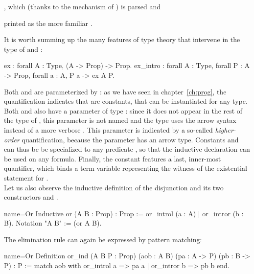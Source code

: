 , which (thanks
to the  mechanism of \Coq{}) is parsed and

printed as the more familiar .

It is worth summing up the many features of type theory that
intervene in the type of  and :

\begin{coq}{}{}
ex : forall A : Type, (A -> Prop) -> Prop.
ex_intro : forall A : Type, forall P : A -> Prop, forall a : A, P a -> ex A P.
\end{coq}

Both  and  are parameterized by : as
we have seen in chapter~\ref{ch:prog}, the 
quantification indicates that  are  
constants, that can be instantiated for any type. Both  and
 also have a parameter of type  : since it
does not appear in the rest of the type of , this parameter is
not named and the type uses the arrow syntax instead of a more verbose
. This parameter is
indicated by a so-called \emph{higher-order} quantification, because
the parameter has an arrow type. Constants   and 
can thus be  be specialized to any predicate , so that the 
inductive declaration can be used on any formula. Finally, the
 constant features a last, inner-most 
quantifier, which binds a term variable  representing the witness
of the existential statement for .\\

Let us also observe the inductive definition of the disjunction 
and its two constructors  and .

\begin{coq}{name=Or}{}
Inductive or (A B : Prop) : Prop := or_introl (a : A) | or_intror (b : B).
Notation "A \/ B" := (or A B).
\end{coq}

The elimination rule can again be expressed by pattern matching:

\begin{coq}{name=Or}{}
Definition or_ind (A B P : Prop)
  (aob : A \/ B) (pa : A -> P) (pb : B -> P) : P :=
  match aob with or_introl a => pa a | or_intror b => pb b end.
\end{coq}

